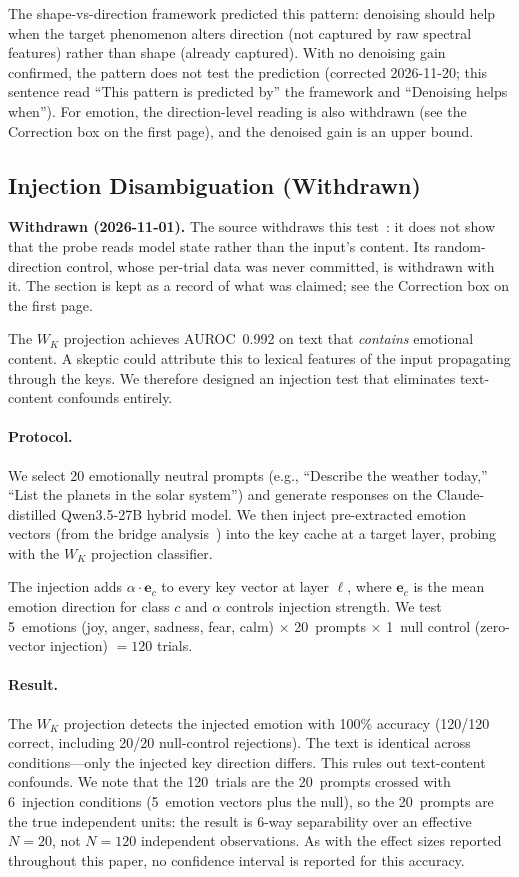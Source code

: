 \documentclass[11pt,a4paper]{article}
\begin{document}
The shape-vs-direction framework predicted this pattern: denoising should
help when the target phenomenon alters direction (not captured by raw
spectral features) rather than shape (already captured). With no denoising
gain confirmed, the pattern does not test the prediction (corrected
2026-11-20; this sentence read ``This pattern is predicted by'' the framework
and ``Denoising helps when''). For emotion, the
direction-level reading is also withdrawn (see the Correction box on
the first page), and the denoised gain is an upper bound.

\subsection{Injection Disambiguation (Withdrawn)}
\label{sec:injection}

\noindent\textbf{Withdrawn (2026-11-01).} The source withdraws this
test~\citep{lyra_p4}: it does not show that the probe reads model state
rather than the input's content. Its random-direction control, whose
per-trial data was never committed, is withdrawn with it. The section is
kept as a record of what was claimed; see the Correction box on the first
page.

The $W_K$ projection achieves AUROC~0.992 on text that \emph{contains}
emotional content. A skeptic could attribute this to lexical features of the
input propagating through the keys. We therefore designed an injection test
that eliminates text-content confounds entirely.

\paragraph{Protocol.} We select 20 emotionally neutral prompts (e.g.,
``Describe the weather today,'' ``List the planets in the solar system'') and
generate responses on the Claude-distilled Qwen3.5-27B hybrid model. We then
inject pre-extracted emotion vectors (from the bridge
analysis~\citep{lyra_p4}) into the key cache at a target layer, probing with
the $W_K$ projection classifier.

The injection adds $\alpha \cdot \mathbf{e}_c$ to every key vector at layer
$\ell$, where $\mathbf{e}_c$ is the mean emotion direction for class $c$ and
$\alpha$ controls injection strength. We test 5~emotions (joy, anger,
sadness, fear, calm) $\times$ 20~prompts $\times$ 1~null control (zero-vector
injection) $= 120$ trials.

\paragraph{Result.} The $W_K$ projection detects the injected emotion with
100\% accuracy (120/120 correct, including 20/20 null-control rejections).
The text is identical across conditions---only the injected key direction
differs. This rules out text-content confounds. We note that the
120~trials are the 20~prompts crossed with 6~injection conditions (5~emotion
vectors plus the null), so the 20~prompts are the true independent units: the
result is 6-way separability over an effective $N{=}20$, not $N{=}120$
independent observations. As with the effect sizes reported throughout this
paper, no confidence interval is reported for this accuracy.
\end{document}
